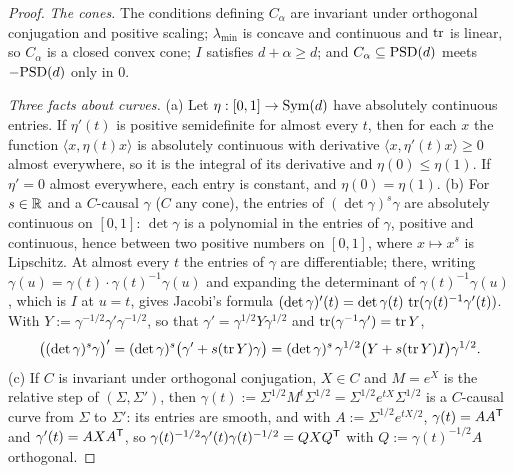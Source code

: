 \begin{proof}
\leanok
\emph{The cones.} The conditions defining $C_\alpha$ are invariant under orthogonal conjugation and positive
scaling; $\lambda_{\min}$ is concave and continuous and $\operatorname{tr}$ is linear, so $C_\alpha$ is a closed convex
cone; $I$ satisfies $d + \alpha \ge d$; and $C_\alpha \subseteq \mathrm{PSD}(d)$ meets $-\mathrm{PSD}(d)$ only in $0$.

\emph{Three facts about curves.} (a) Let $\eta : [0,1] \to \mathrm{Sym}(d)$ have absolutely continuous entries. If
$\eta'(t)$ is positive semidefinite for almost every $t$, then for each $x$ the function $\langle x,
\eta(t)x\rangle$ is absolutely continuous with derivative $\langle x, \eta'(t)x\rangle \ge 0$ almost
everywhere, so it is the integral of its derivative and $\eta(0) \le \eta(1)$. If $\eta' = 0$ almost
everywhere, each entry is constant, and $\eta(0) = \eta(1)$. (b) For $s \in \mathbb{R}$ and a $C$-causal $\gamma$
($C$ any cone), the entries of $(\det\gamma)^s\gamma$ are absolutely continuous on $[0,1]$: $\det\gamma$ is a
polynomial in the entries of $\gamma$, positive and continuous, hence between two positive numbers on
$[0,1]$, where $x \mapsto x^s$ is Lipschitz. At almost every $t$ the entries of $\gamma$ are differentiable;
there, writing $\gamma(u) = \gamma(t)\cdot\gamma(t)^{-1}\gamma(u)$ and expanding the determinant of
$\gamma(t)^{-1}\gamma(u)$, which is $I$ at $u = t$, gives Jacobi's formula $(\det\gamma)'(t) =
\det\gamma(t)\,\operatorname{tr}(\gamma(t)^{-1}\gamma'(t))$. With $Y := \gamma^{-1/2}\gamma'\gamma^{-1/2}$, so that
$\gamma' = \gamma^{1/2}Y\gamma^{1/2}$ and $\operatorname{tr}(\gamma^{-1}\gamma') = \operatorname{tr} Y$,
\[
  \bigl((\det\gamma)^s\gamma\bigr)' = (\det\gamma)^s\bigl(\gamma' + s(\operatorname{tr} Y)\gamma\bigr)
  = (\det\gamma)^s\,\gamma^{1/2}\bigl(Y + s(\operatorname{tr} Y)I\bigr)\gamma^{1/2} .
\]
(c) If $C$ is invariant under orthogonal conjugation, $X \in C$ and $M = e^X$ is the relative step of
$(\Sigma, \Sigma')$, then $\gamma(t) := \Sigma^{1/2}M^t\Sigma^{1/2} = \Sigma^{1/2}e^{tX}\Sigma^{1/2}$ is a
$C$-causal curve from $\Sigma$ to $\Sigma'$: its entries are smooth, and with $A := \Sigma^{1/2}e^{tX/2}$,
$\gamma(t) = AA^{\mathsf{T}}$ and $\gamma'(t) = AXA^{\mathsf{T}}$, so $\gamma(t)^{-1/2}\gamma'(t)\gamma(t)^{-1/2} =
QXQ^{\mathsf{T}}$ with $Q := \gamma(t)^{-1/2}A$ orthogonal.


\end{proof}
